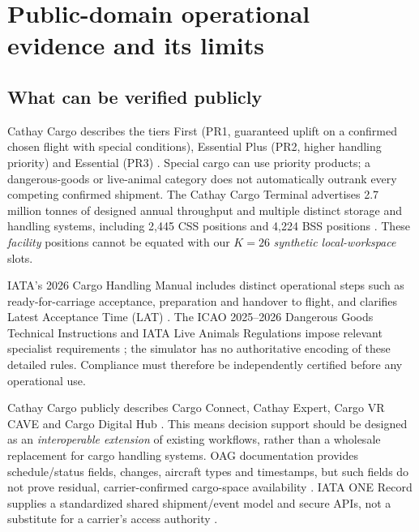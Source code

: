 \documentclass[10pt,a4paper]{article}
\theoremstyle{definition}\newtheorem{definition}[theorem]{Definition}
\theoremstyle{remark}\newtheorem{remark}[theorem]{Remark}
\newcommand{\1}{\mathbbm 1}
\begin{document}
\section{Public-domain operational evidence and its limits}
\subsection{What can be verified publicly}
Cathay Cargo describes the tiers First (PR1, guaranteed uplift on a confirmed chosen flight with special conditions), Essential Plus (PR2, higher handling priority) and Essential (PR3) \cite{cathaypriority}. Special cargo can use priority products; a dangerous-goods or live-animal category does not automatically outrank every competing confirmed shipment. The Cathay Cargo Terminal advertises 2.7 million tonnes of designed annual throughput and multiple distinct storage and handling systems, including 2,445 CSS positions and 4,224 BSS positions \cite{terminalfacts}. These \emph{facility} positions cannot be equated with our $K=26$ \emph{synthetic local-workspace} slots.

IATA's 2026 Cargo Handling Manual includes distinct operational steps such as ready-for-carriage acceptance, preparation and handover to flight, and clarifies Latest Acceptance Time (LAT) \cite{ichm}. The ICAO 2025--2026 Dangerous Goods Technical Instructions and IATA Live Animals Regulations impose relevant specialist requirements \cite{icao,lar}; the simulator has no authoritative encoding of these detailed rules. Compliance must therefore be independently certified before any operational use.

Cathay Cargo publicly describes Cargo Connect, Cathay Expert, Cargo VR CAVE and Cargo Digital Hub \cite{cathaydigital}. This means decision support should be designed as an \emph{interoperable extension} of existing workflows, rather than a wholesale replacement for cargo handling systems. OAG documentation provides schedule/status fields, changes, aircraft types and timestamps, but such fields do not prove residual, carrier-confirmed cargo-space availability \cite{oagfields,oagjoin}. IATA ONE Record supplies a standardized shared shipment/event model and secure APIs, not a substitute for a carrier's access authority \cite{onerecord}.
\end{document}
